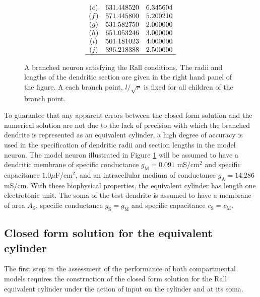 \begin{figure}[!h]
\[\begin{array}{ccc}
 (e) & 631.448520 & 6.345604 \\
 (f) & 571.445800 & 5.200210 \\
 (g) & 531.582750 & 2.000000 \\
 (h) & 651.053246 & 3.000000 \\
 (i) & 501.181023 & 4.000000 \\
 (j) & 396.218388 & 2.500000 \\
\hline
\end{array}
\]
\centering
\parbox{5in}{\caption{\label{TestNeuron} A branched neuron
satisfying the Rall conditions. The radii and lengths of the
dendritic section are given in the right hand panel of the figure.
A each branch point, $l/\sqrt{r}$ is fixed for all children of the
branch point.}}
\end{figure}

To guarantee that any apparent errors between the closed form
solution and the numerical solution are not due to the lack of
precision with which the branched dendrite is represented as an
equivalent cylinder, a high degree of accuracy is used in the
specification of dendritic radii and section lengths in the model
neuron. The model neuron illustrated in Figure \ref{TestNeuron}
will be assumed to have a dendritic membrane of specific
conductance $g_\mathrm{M}=0.091$ mS/cm$^2$ and specific
capacitance $1.0\mu$F/cm$^2$, and an intracellular medium of
conductance $g_\mathrm{A}=14.286$ mS/cm. With these biophysical
properties, the equivalent cylinder has length one electrotonic
unit. The soma of the test dendrite is assumed to have a membrane
of area $A_\mathrm{S}$, specific conductance $g_\mathrm{S}=g_\mathrm{M}$ and
specific capacitance $c_\mathrm{S}=c_\mathrm{M}$.

\subsection{Closed form solution for the equivalent cylinder}
The first step in the assessment of the performance of both
compartmental models requires the construction of the closed form
solution for the Rall equivalent cylinder under the action of
input on the cylinder and at its soma.

